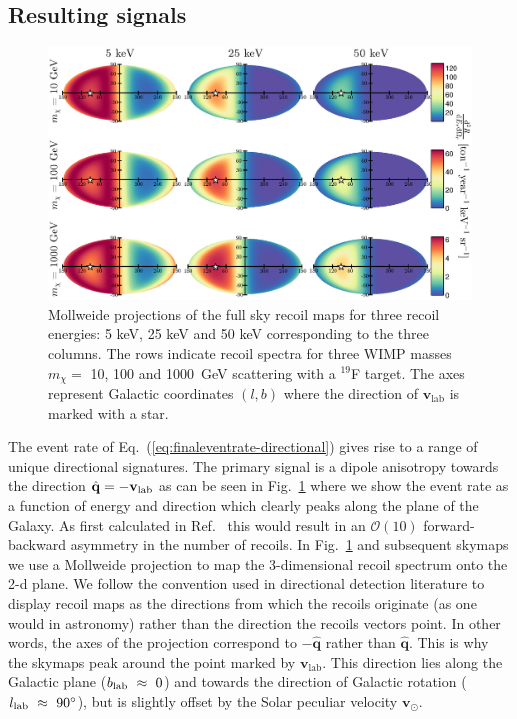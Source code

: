 \subsection{Resulting signals}\label{sec:directional_signals}
\begin{figure}
	\centering
	\includegraphics[trim = 0mm 0mm 0mm 0mm, clip, width=\textwidth]{Figures/skymaps_mchi.eps}
	\caption[Directional recoil skymaps for three WIMP masses]{Mollweide projections of the full sky recoil maps for three recoil energies: 5 keV, 25 keV and 50 keV corresponding to the three columns. The rows indicate recoil spectra for three WIMP masses $m_\chi = $ 10, 100 and 1000~GeV scattering with a $^{19}$F target. The axes represent Galactic coordinates $(l,b)$ where the direction of $\textbf{v}_\textrm{lab}$ is marked with a star.}
	\label{fig:skymaps_mchi}
\end{figure}

The event rate of Eq.~(\ref{eq:finaleventrate-directional}) gives rise to a range of unique directional signatures. The primary signal is a dipole anisotropy towards the direction $\hat{\bf{q}} = -{\bf v}_{\rm lab}$ as can be seen in Fig.~\ref{fig:skymaps_mchi} where we show the event rate as a function of energy and direction which clearly peaks along the plane of the Galaxy. As first calculated in Ref.~\cite{Spergel:1987kx} this would result in an $\mathcal{O}(10)$ forward-backward asymmetry in the number of recoils. In Fig.~\ref{fig:skymaps_mchi} and subsequent skymaps we use a Mollweide projection to map the 3-dimensional recoil spectrum onto the 2-d plane. We follow the convention used in directional detection literature to display recoil maps as the directions from which the recoils originate (as one would in astronomy) rather than the direction the recoils vectors point. In other words, the axes of the projection correspond to $-\hat{\textbf{q}}$ rather than $\hat{\textbf{q}}$. This is why the skymaps peak around the point marked by $\textbf{v}_\textrm{lab}$. This direction lies along the Galactic plane ($b_{\rm lab}~\approx~0$) and towards the direction of Galactic rotation ($l_{\rm lab}~\approx~90^\circ$), but is slightly offset by the Solar peculiar velocity $\textbf{v}_\odot$.

